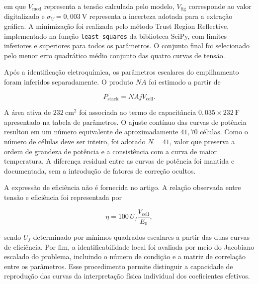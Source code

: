 em que $V_{\mathrm{mod}}$ representa a tensão calculada pelo modelo,
$V_{\mathrm{fig}}$ corresponde ao valor digitalizado e
$\sigma_V=0{,}003~\mathrm{V}$ representa a incerteza adotada para a
extração gráfica. A minimização foi realizada pelo método Trust Region
Reflective, implementado na função \texttt{least\_squares} da biblioteca
SciPy, com limites inferiores e superiores para todos os parâmetros. O
conjunto final foi selecionado pelo menor erro quadrático médio conjunto das
quatro curvas de tensão.

Após a identificação eletroquímica, os parâmetros escalares do empilhamento
foram inferidos separadamente. O produto $N A$ foi estimado a partir de

\begin{equation}
P_{\mathrm{stack}}=N A j V_{\mathrm{cell}}.
\end{equation}

A área ativa de $232~\mathrm{cm^2}$ foi associada ao termo de capacitância
$0{,}035\times232~\mathrm{F}$ apresentado na tabela de parâmetros. O ajuste
contínuo das curvas de potência resultou em um número equivalente de
aproximadamente $41{,}70$ células. Como o número de células deve ser inteiro,
foi adotado $N=41$, valor que preserva a ordem de grandeza de potência e a
consistência com a curva de maior temperatura. A diferença residual entre as
curvas de potência foi mantida e documentada, sem a introdução de fatores de
correção ocultos.

A expressão de eficiência não é fornecida no artigo. A relação observada
entre tensão e eficiência foi representada por

\begin{equation}
\eta=100\,U_f\frac{V_{\mathrm{cell}}}{E_0},
\end{equation}

sendo $U_f$ determinado por mínimos quadrados escalares a partir das duas
curvas de eficiência. Por fim, a identificabilidade local foi avaliada por
meio do Jacobiano escalado do problema, incluindo o número de condição e a
matriz de correlação entre os parâmetros. Esse procedimento permite
distinguir a capacidade de reprodução das curvas da interpretação física
individual dos coeficientes efetivos.
